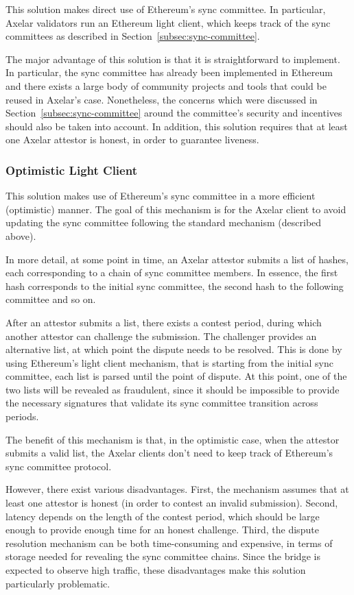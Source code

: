 This solution makes direct use of Ethereum's sync committee. In particular,
Axelar validators run an Ethereum light client, which keeps track of the sync
committees as described in Section~\ref{subsec:sync-committee}.

The major advantage of this solution is that it is straightforward to
implement. In particular, the sync committee has already been implemented in
Ethereum and there exists a large body of community projects and tools that
could be reused in Axelar's case. Nonetheless, the concerns which were
discussed in Section~\ref{subsec:sync-committee} around the committee's
security and incentives should also be taken into account. In addition, this
solution requires that at least one Axelar attestor is honest, in order to
guarantee liveness.

\subsubsection{Optimistic Light Client}

This solution makes use of Ethereum's sync committee in a more efficient
(optimistic) manner. The goal of this mechanism is for the Axelar client to
avoid updating the sync committee following the standard mechanism (described
above).

In more detail, at some point in time, an Axelar attestor submits a list of
hashes, each corresponding to a chain of sync committee members. In essence,
the first hash corresponds to the initial sync committee, the second hash to
the following committee and so on.

After an attestor submits a list, there exists a contest period, during which
another attestor can challenge the submission. The challenger provides an
alternative list, at which point the dispute needs to be resolved. This is done
by using Ethereum's light client mechanism, that is starting from the initial
sync committee, each list is parsed until the point of dispute. At this point,
one of the two lists will be revealed as fraudulent, since it should be
impossible to provide the necessary signatures that validate its sync committee
transition across periods.

The benefit of this mechanism is that, in the optimistic case, when the
attestor submits a valid list, the Axelar clients don't need to keep track of
Ethereum's sync committee protocol.

However, there exist various disadvantages. First, the mechanism assumes that
at least one attestor is honest (in order to contest an invalid submission).
Second, latency depends on the length of the contest period, which should be
large enough to provide enough time for an honest challenge. Third, the dispute
resolution mechanism can be both time-consuming and expensive, in terms of
storage needed for revealing the sync committee chains.
Since the bridge is expected to observe high traffic, these disadvantages make
this solution particularly problematic. 

